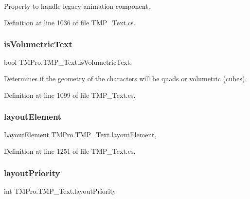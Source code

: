 Property to handle legacy animation component. 



Definition at line 1036 of file T\+M\+P\+\_\+\+Text.\+cs.

\mbox{\label{class_t_m_pro_1_1_t_m_p___text_ad36339b6ac85f11142cab2bd8f336abd}} 
\subsubsection{\texorpdfstring{isVolumetricText}{isVolumetricText}}
{\footnotesize\ttfamily bool T\+M\+Pro.\+T\+M\+P\+\_\+\+Text.\+is\+Volumetric\+Text\hspace{0.3cm}{\ttfamily [get]}, {\ttfamily [set]}}



Determines if the geometry of the characters will be quads or volumetric (cubes). 



Definition at line 1099 of file T\+M\+P\+\_\+\+Text.\+cs.

\mbox{\label{class_t_m_pro_1_1_t_m_p___text_a61b28f09fc8b65fa0dd44be148751f6e}} 
\subsubsection{\texorpdfstring{layoutElement}{layoutElement}}
{\footnotesize\ttfamily Layout\+Element T\+M\+Pro.\+T\+M\+P\+\_\+\+Text.\+layout\+Element\hspace{0.3cm}{\ttfamily [get]}, {\ttfamily [protected]}}







Definition at line 1251 of file T\+M\+P\+\_\+\+Text.\+cs.

\mbox{\label{class_t_m_pro_1_1_t_m_p___text_a5d348749c0944d708b27bbf46581f460}} 
\subsubsection{\texorpdfstring{layoutPriority}{layoutPriority}}
{\footnotesize\ttfamily int T\+M\+Pro.\+T\+M\+P\+\_\+\+Text.\+layout\+Priority\hspace{0.3cm}{\ttfamily [get]}}







